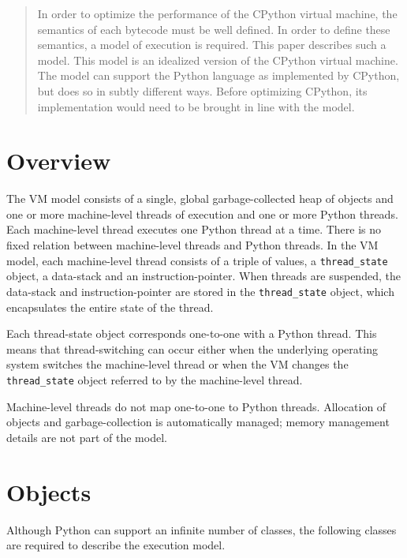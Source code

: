 \documentclass[a4paper,10pt]{article}
\title{}
\author{}
\begin{document}
\maketitle

\begin{abstract}

In order to optimize the performance of the CPython virtual machine, the semantics of each bytecode
must be well defined. In order to define these semantics, a model of execution is required. This paper describes such a model.
This model is an idealized version of the CPython virtual machine. The model can support the Python language as implemented by CPython,
but does so in subtly different ways. Before optimizing CPython, its implementation would need to be brought in line with the model.

\end{abstract}

\section{Overview}

The VM model consists of a single, global garbage-collected heap of objects and one or more machine-level threads of execution and one or more
Python threads. Each machine-level thread executes one Python thread at a time.
There is no fixed relation between machine-level threads and Python threads.
In the VM model, each machine-level thread consists of a triple of values, a \verb|thread_state| object, a data-stack and an  instruction-pointer.
When threads are suspended, the data-stack and instruction-pointer are stored in the \verb|thread_state| object, which encapsulates the entire state of the thread.

Each thread-state object corresponds one-to-one with a Python thread. This means that thread-switching can occur either when the underlying operating system switches the machine-level thread or when the VM changes the \verb|thread_state| object referred to by the machine-level thread.

Machine-level threads do not map one-to-one to Python threads. Allocation of objects and garbage-collection is automatically managed; memory management details are not part of the model.

\section{Objects}

Although Python can support an infinite number of classes,
the following classes are required to describe the execution model.
\end{document}
